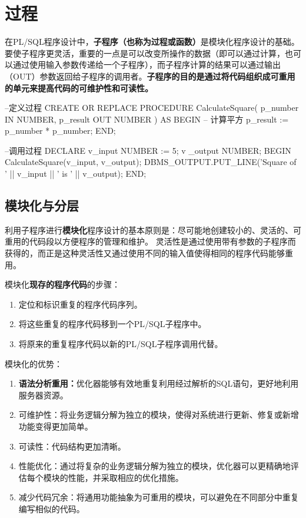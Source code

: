 \documentclass[11pt, a4paper, oneside, UTF8]{ctexbook}
\let\kaishu\relax %
\begin{document}
\chapter{过程}
在PL/SQL程序设计中，{\bfseries\kaishu 子程序（也称为过程或函数）}是模块化程序设计的基础。要使子程序更灵活，重要的一点是可以改变所操作的数据（即可以通过计算，也可以通过使用输入参数传递给一个子程序），而子程序计算的结果可以通过输出（OUT）参数返回给子程序的调用者。{\bfseries\kaishu 子程序的目的是通过将代码组织成可重用的单元来提高代码的可维护性和可读性。}

\begin{plsql}[caption=子程序示例]
--定义过程
CREATE OR REPLACE PROCEDURE CalculateSquare(
  p_number IN NUMBER,
  p_result OUT NUMBER
) AS
BEGIN
  -- 计算平方
  p_result := p_number * p_number;
END;

--调用过程
DECLARE
  v_input NUMBER := 5;
v _output NUMBER;
BEGIN
  CalculateSquare(v_input, v_output);
  DBMS_OUTPUT.PUT_LINE('Square of ' || v_input || ' is ' || v_output);
END;
\end{plsql}
\section{模块化与分层}
利用子程序进行{\bfseries\kaishu 模块化}程序设计的基本原则是：尽可能地创建较小的、灵活的、可重用的代码段以方便程序的管理和维护。
灵活性是通过使用带有参数的子程序而获得的，而正是这种灵活性又通过使用不同的输入值使得相同的程序代码能够重用。

模块化{\bfseries\kaishu 现存的程序代码}的步骤：
\begin{enumerate}
  \item 定位和标识重复的程序代码序列。
  \item 将这些重复的程序代码移到一个PL/SQL子程序中。
  \item 将原来的重复程序代码以新的PL/SQL子程序调用代替。
\end{enumerate}

模块化的优势：
\begin{enumerate}
  \item {\bfseries\kaishu 语法分析重用：}优化器能够有效地重复利用经过解析的SQL语句，更好地利用服务器资源。
  \item 可维护性：将业务逻辑分解为独立的模块，使得对系统进行更新、修复或新增功能变得更加简单。
  \item 可读性：代码结构更加清晰。
  \item 性能优化：通过将复杂的业务逻辑分解为独立的模块，优化器可以更精确地评估每个模块的性能，并采取相应的优化措施。
  \item 减少代码冗余：将通用功能抽象为可重用的模块，可以避免在不同部分中重复编写相似的代码。
\end{enumerate}
\end{document}
